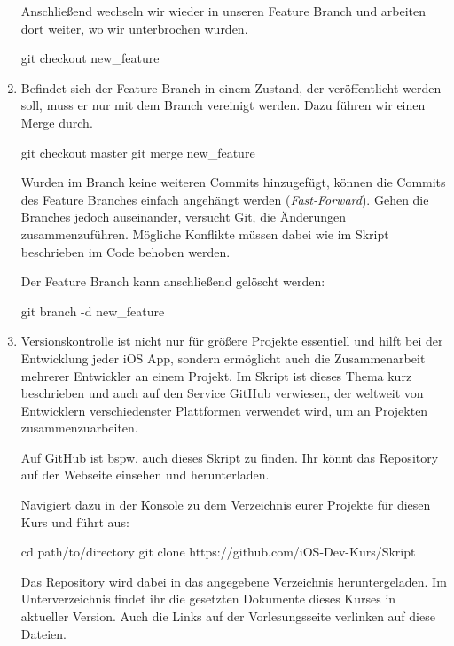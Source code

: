 \documentclass[parskip=half, final]{scrreprt}
\begin{document}
\begin{lecture}
\begin{enumerate}
Anschließend wechseln wir wieder in unseren Feature Branch und arbeiten dort weiter, wo wir unterbrochen wurden.

\begin{shlst}
git checkout new_feature
\end{shlst}

\item Befindet sich der Feature Branch in einem Zustand, der veröffentlicht werden soll, muss er nur mit dem  Branch vereinigt werden. Dazu führen wir einen Merge durch.

\begin{shlst}
git checkout master
git merge new_feature
\end{shlst}

Wurden im  Branch keine weiteren Commits hinzugefügt, können die Commits des Feature Branches einfach angehängt werden (\emph{Fast-Forward}). Gehen die Branches jedoch auseinander, versucht Git, die Änderungen zusammenzuführen. Mögliche Konflikte müssen dabei wie im Skript beschrieben im Code behoben werden.

Der Feature Branch kann anschließend gelöscht werden:

\begin{shlst}
git branch -d new_feature
\end{shlst}

\item Versionskontrolle ist nicht nur für größere Projekte essentiell und hilft bei der Entwicklung jeder iOS App, sondern ermöglicht auch die Zusammenarbeit mehrerer Entwickler an einem Projekt. Im Skript ist dieses Thema kurz beschrieben und auch auf den Service GitHub  verwiesen, der weltweit von Entwicklern verschiedenster Plattformen verwendet wird, um an Projekten zusammenzuarbeiten.

Auf GitHub ist bspw. auch dieses Skript zu finden. Ihr könnt das Repository auf der Webseite einsehen  und herunterladen.

Navigiert dazu in der Konsole zu dem Verzeichnis eurer Projekte für diesen Kurs und führt  aus:

\begin{shlst}
cd path/to/directory
git clone https://github.com/iOS-Dev-Kurs/Skript
\end{shlst}

Das Repository wird dabei in das angegebene Verzeichnis heruntergeladen. Im Unterverzeichnis  findet ihr die gesetzten Dokumente dieses Kurses in aktueller Version. Auch die Links auf der Vorlesungsseite verlinken auf diese Dateien.


\end{enumerate}
\end{lecture}
\end{document}
